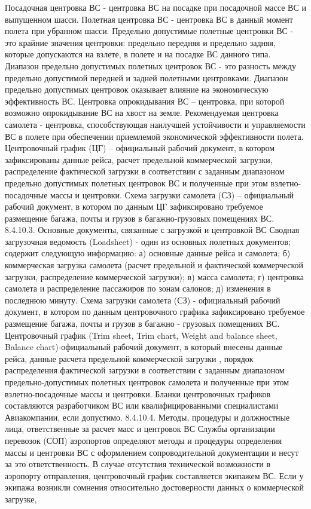 Посадочная центровка ВС - центровка ВС на посадке при посадочной массе ВС и выпущенном шасси.
Полетная центровка ВС - центровка ВС в данный момент полета при убранном шасси.
Предельно допустимые полетные центровки ВС - это крайние значения центровки: предельно передняя и предельно задняя, которые допускаются на взлете, в полете и на посадке ВС данного типа.
Диапазон предельно допустимых полетных центровок ВС - это разность между предельно допустимой передней и задней полетными центровками. Диапазон предельно допустимых центровок оказывает влияние на экономическую эффективность ВС.
Центровка опрокидывания ВС – центровка, при которой возможно опрокидывание ВС на хвост на земле.
Рекомендуемая центровка самолета - центровка, способствующая наилучшей устойчивости и управляемости ВС в полете при обеспечении приемлемой экономической эффективности полета.
Центровочный график (ЦГ) – официальный рабочий документ, в котором зафиксированы данные рейса, расчет предельной коммерческой загрузки, распределение фактической загрузки в соответствии с заданным диапазоном предельно допустимых полетных центровок ВС и полученные при этом взлетно-посадочные массы и центровки. 
Схема загрузки самолета (СЗ) – официальный рабочий документ, в котором по данным ЦГ зафиксировано требуемое размещение багажа, почты и грузов в багажно-грузовых помещениях ВС.
8.4.10.3. Основные документы, связанные с загрузкой и центровкой ВС
Сводная загрузочная ведомость (Loadsheet) - один из основных полетных документов; содержит следующую информацию:
а)	основные данные рейса и самолета;
б)	коммерческая загрузка самолета (расчет предельной и фактической коммерческой загрузки, распределение коммерческой загрузки);
в)	масса самолета;
г)	центровка самолета и распределение пассажиров по зонам салонов;
д)	изменения в последнюю минуту.
Схема загрузки самолета (СЗ) - официальный рабочий документ, в котором по данным центровочного графика зафиксировано требуемое размещение багажа, почты и грузов в багажно - грузовых помещениях ВС.
Центровочный график (Trim sheet, Trim chart, Weight and balance sheet, Balance chart)-официальный рабочий документ, в который внесены данные рейса, данные расчета предельной коммерческой загрузки , порядок распределения фактической загрузки в соответствии с заданным диапазоном предельно-допустимых полетных центровок самолета и полученные при этом взлетно-посадочные массы и центровки.
Бланки центровочных графиков составляются разработчиком ВС или квалифицированными специалистами Авиакомпании, если допустимо.
8.4.10.4. Методы, процедуры и должностные лица, ответственные за расчет масс и центровок ВС
Службы организации перевозок (СОП) аэропортов определяют методы и процедуры определения массы и центровки ВС с оформлением сопроводительной документации и несут за это ответственность. В случае отсутствия технической возможности в аэропорту отправления, центровочный график составляется экипажем ВС.
Если у экипажа возникли сомнения относительно достоверности данных о коммерческой загрузке,  
 

